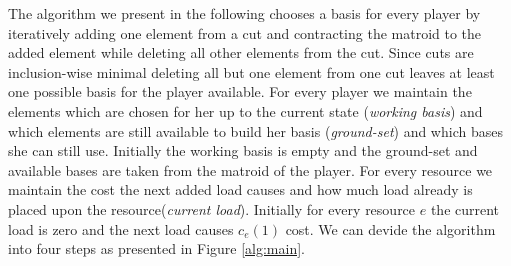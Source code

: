 \documentclass{scrartcl}
\theoremstyle{nonumberplain}
\begin{document}
The algorithm we present in the following chooses a basis for every player by
iteratively adding one element from a cut and contracting the matroid to the
added element while deleting all other elements from the cut. Since cuts are
inclusion-wise minimal deleting all but one element from one cut leaves at
least one possible basis for the player available. For every player we maintain
the elements which are chosen for her up to the current state
(\emph{working basis}) and which elements are still available to build her
basis (\emph{ground-set}) and which bases she can still use. Initially the
working basis is empty and the ground-set and available bases are taken from
the matroid of the player. For every resource we maintain the cost the next
added load causes and how much load already is placed upon the
resource(\emph{current load}). Initially for every resource $e$ the current
load is zero and the next load causes $c_{e}(1)$ cost. We can devide the
algorithm into four steps as presented in Figure \ref{alg:main}.
\end{document}

